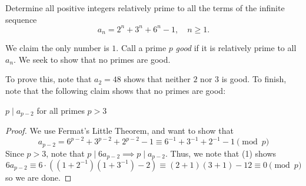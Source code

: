 
\begin{problem}[ISL 2005 N1]
    Determine all positive integers relatively prime to all the terms of the infinite sequence
    \[a_n=2^n+3^n+6^n-1, \quad n \geq 1.\]
\end{problem}

\begin{solution}
    We claim the only number is $1$. Call a prime $p$ \textit{good} if it is relatively prime to all $a_n$. We seek to show that no primes are good.
    
    To prove this, note that $a_2 = 48$ shows that neither $2$ nor $3$ is good. To finish, note that the following claim shows that no primes are good:
    
    \begin{claim*}
    $p \mid a_{p-2}$ for all primes $p > 3$
    \end{claim*}
    \begin{proof}
    We use Fermat's Little Theorem, and want to show that \[a_{p-2} = 6^{p-2} + 3^{p-2} + 2^{p-2} - 1 \equiv 6^{-1} + 3^{-1} + 2^{-1} - 1 \pmod p \tag{1}\]
    Since $p > 3$, note that $p \mid 6a_{p-2} \implies p \mid a_{p-2}$. Thus, we note that (1) shows \[6a_{p-2} \equiv 6 \cdot ((1 + 2^{-1})(1 + 3^{-1}) - 2) \equiv (2 + 1)(3 + 1) - 12 \equiv 0 \pmod p\] so we are done.
    \end{proof}
\end{solution}
